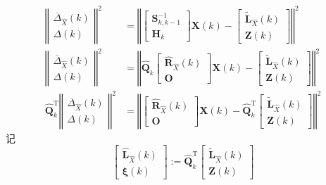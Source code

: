 \documentclass[cn,10pt,citestyle=gb7714-2015,bibstyle=gb7714-2015]{elegantbook}
\newcommand{\mT}{\mathrm{T}}
\begin{document}
\begin{align*}
  \left\Vert\begin{matrix}
    \overline{\bm{\varDelta}}_{\hat{X}}(k)\\
    \bm{\varDelta}(k)
  \end{matrix}\right\Vert^2&=
  \left\Vert\begin{bmatrix}
    \bm{S}_{k,k-1}^{-1}\\
    \bm{H}_k
  \end{bmatrix}\bm{X}(k)-\begin{bmatrix}
    \widetilde{\bm{L}}_{\hat{X}}(k)\\
    \bm{Z}(k)
  \end{bmatrix}\right\Vert^2\\
  \left\Vert\begin{matrix}
    \overline{\bm{\varDelta}}_{\hat{X}}(k)\\
    \bm{\varDelta}(k)
  \end{matrix}\right\Vert^2&=
  \left\Vert\hat{\bm{Q}}_k\begin{bmatrix}
    \hat{\bm{R}}_{\hat{X}}(k)\\
    \bm{O}
  \end{bmatrix}\bm{X}(k)-\begin{bmatrix}
    \widetilde{\bm{L}}_{\hat{X}}(k)\\
    \bm{Z}(k)
  \end{bmatrix}\right\Vert^2\\
  \hat{\bm{Q}}_k^\mT\left\Vert\begin{matrix}
    \overline{\bm{\varDelta}}_{\hat{X}}(k)\\
    \bm{\varDelta}(k)
  \end{matrix}\right\Vert^2&=
  \left\Vert\begin{bmatrix}
    \hat{\bm{R}}_{\hat{X}}(k)\\
    \bm{O}
  \end{bmatrix}\bm{X}(k)-\hat{\bm{Q}}_k^\mT\begin{bmatrix}
    \widetilde{\bm{L}}_{\hat{X}}(k)\\
    \bm{Z}(k)
  \end{bmatrix}\right\Vert^2
\end{align*}
记
\begin{equation}
  \begin{bmatrix}
    \hat{\bm{L}}_{\hat{X}}(k)\\
    \bm{\xi}(k)
  \end{bmatrix}:=\hat{\bm{Q}}_k^\mT\begin{bmatrix}
    \widetilde{\bm{L}}_{\hat{X}}(k)\\
    \bm{Z}(k)
  \end{bmatrix}
\end{equation}
\end{document}
